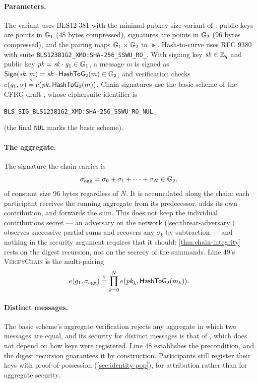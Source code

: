 \documentclass[11pt,a4paper]{article}
\begin{document}
\paragraph{Parameters.}
The variant uses BLS12-381 \citep{ietf-pairing-curves} with the
minimal-pubkey-size variant of \citet{ietf-bls-signature}: public keys
are points in $\mathbb{G}_{1}$ (48 bytes compressed), signatures are points in
$\mathbb{G}_{2}$ (96 bytes compressed), and the pairing maps
$\mathbb{G}_{1} \times \mathbb{G}_{2}$ to $\Gt$. Hash-to-curve uses RFC 9380
\citep{rfc9380} with suite \texttt{BLS12381G2\_XMD:SHA-256\_SSWU\_RO\_}.
With signing key $\mathit{sk} \in \mathbb{Z}_q$ and public key
$\mathit{pk} = \mathit{sk} \cdot g_1 \in \mathbb{G}_{1}$, a message $m$ is signed as
$\mathsf{Sign}(\mathit{sk}, m) = \mathit{sk} \cdot \mathsf{HashToG}_2(m) \in \mathbb{G}_{2}$, and verification checks
$e(g_1, \sigma) \overset{?}{=} e(\mathit{pk}, \mathsf{HashToG}_2(m))$. Chain
signatures use the basic scheme of the CFRG draft
\citep{ietf-bls-signature}, whose ciphersuite identifier is
\begin{center}
\texttt{BLS\_SIG\_BLS12381G2\_XMD:SHA-256\_SSWU\_RO\_NUL\_}
\end{center}
(the final \texttt{NUL} marks the basic scheme).

\paragraph{The aggregate.}
The signature the chain carries is
\begin{equation}
\sigma_{\text{agg}} = \sigma_0 + \sigma_1 + \cdots + \sigma_N \in \mathbb{G}_{2},
\end{equation}
of constant size 96 bytes regardless of $N$. It is accumulated along the
chain: each participant receives the running aggregate from its
predecessor, adds its own contribution, and forwards the sum. This does
not keep the individual contributions secret --- an adversary on the
network (\cref{sec:threat-adversary}) observes successive partial sums
and recovers any $\sigma_k$ by subtraction --- and nothing in the
security argument requires that it should: \cref{thm:chain-integrity}
rests on the digest recursion, not on the secrecy of the summands. Line
49's \textsc{VerifyChain} is the multi-pairing
\begin{equation}
\label{eq:multipairing}
e(g_1, \sigma_{\text{agg}}) \overset{?}{=}
    \prod_{k=0}^{N} e(\mathit{pk}_k, \mathsf{HashToG}_2(m_k)).
\end{equation}

\paragraph{Distinct messages.}
The basic scheme's aggregate verification rejects any aggregate in which
two messages are equal, and its security for distinct messages is that
of \citet{bgls2003aggregate}, which does not depend on how keys were
registered. Line 48 establishes the precondition, and the digest
recursion guarantees it by construction. Participants still register
their keys with proof-of-possession (\cref{sec:identity-pop}), for
attribution rather than for aggregate security.
\end{document}
